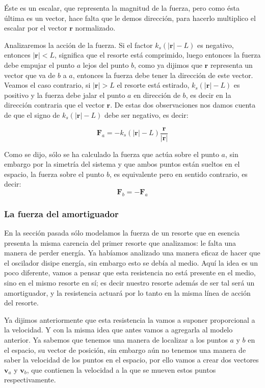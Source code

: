 Éste es un escalar, que representa la magnitud de la fuerza, pero como ésta última es un vector, hace falta que le demos dirección, para hacerlo multiplico el escalar por el vector $\textbf{r}$ normalizado.

Analizaremos la acción de la fuerza.
Si el factor $k_s \left( |\textbf{r}| - L \right)$ es negativo, entonces $| \textbf{r} | < L$, significa que el resorte está comprimido, luego entonces la fuerza debe empujar el punto $a$ lejos del punto $b$, como ya dijimos que $\textbf{r}$ representa un vector que va de $b$ a $a$, entonces la fuerza debe tener la dirección de este vector.
Veamos el caso contrario, si $ | \textbf{r} | > L $ el resorte está estirado, $k_s \left( |\textbf{r}| - L \right)$ es positivo y la fuerza debe jalar el punto $a$ en dirección de $b$, es decir en la dirección contraria que el vector $\textbf{r}$.
De estas dos observaciones nos damos cuenta de que el signo de $k_s \left( |\textbf{r}| - L \right)$ debe ser negativo, es decir:

\begin{equation}
\label{fuerza:resorte}
\textbf{F}_a = -k_s \left( |\textbf{r}| - L \right) \frac{\textbf{r}}{|\textbf{r}|}
\end{equation}

Como se dijo, sólo se ha calculado la fuerza que actúa sobre el punto $a$, sin embargo por la simetría del sistema y que ambos puntos están sueltos en el espacio, la fuerza sobre el punto $b$, es equivalente pero en sentido contrario, es decir:
$$ \textbf{F}_b = - \textbf{F}_a $$

\subsubsection{La fuerza del amortiguador}

En la sección pasada sólo modelamos la fuerza de un resorte que en esencia presenta la misma carencia del primer resorte que analizamos: le falta una manera de perder energía.
Ya habíamos analizado una manera eficaz de hacer que el oscilador disipe energía, sin embargo esto se debía al medio.
Aquí la idea es un poco diferente, vamos a pensar que esta resistencia no está presente en el medio, sino en el mismo resorte en sí; es decir nuestro resorte además de ser tal será un amortiguador, y la resistencia actuará por lo tanto en la misma línea de acción del resorte.

Ya dijimos anteriormente que esta resistencia la vamos a suponer proporcional a la velocidad.
Y con la misma idea que antes vamos a agregarla al modelo anterior.
Ya sabemos que tenemos una manera de localizar a los puntos $a$ y $b$ en el espacio, su vector de posición, sin embargo aún no tenemos una manera de saber la velocidad de los puntos en el espacio, por ello vamos a crear dos vectores $\textbf{v}_a$ y $\textbf{v}_b$, que contienen la velocidad a la que se mueven estos puntos respectivamente.

